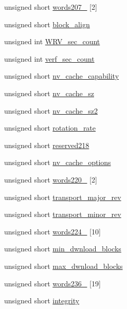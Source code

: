 \begin{DoxyCompactItemize}
unsigned short \hyperlink{structSATA__ident_a6d22ea8ccce917853c3558482d51c2ad}{words207\+\_} \mbox{[}2\mbox{]}
\item 
unsigned short \hyperlink{structSATA__ident_a7d3d9ee177c7fbdf752d10c4df81ce9f}{block\+\_\+align}
\item 
unsigned int \hyperlink{structSATA__ident_a9666dd870fe2ef49ea21adb0b897022d}{W\+R\+V\+\_\+sec\+\_\+count}
\item 
unsigned int \hyperlink{structSATA__ident_ac94f9f7b192f2f636310b6718d752aea}{verf\+\_\+sec\+\_\+count}
\item 
unsigned short \hyperlink{structSATA__ident_ad1ca0009d9c3bb07fc592074c4d0fa71}{nv\+\_\+cache\+\_\+capability}
\item 
unsigned short \hyperlink{structSATA__ident_a0a2b0b5c33bf357f681b9c96f82ac845}{nv\+\_\+cache\+\_\+sz}
\item 
unsigned short \hyperlink{structSATA__ident_a3d5a99c03cd6d648e743734cb5982f8d}{nv\+\_\+cache\+\_\+sz2}
\item 
unsigned short \hyperlink{structSATA__ident_ab28e705ed0d36775a4782ee4d5c37899}{rotation\+\_\+rate}
\item 
unsigned short \hyperlink{structSATA__ident_a06e5d3fdae8830492b2a8360a229f8d4}{reserved218}
\item 
unsigned short \hyperlink{structSATA__ident_a1cc18559fb89be13ccce7858162049b4}{nv\+\_\+cache\+\_\+options}
\item 
unsigned short \hyperlink{structSATA__ident_aa7710925f1b4b459e6499ce2d3e82408}{words220\+\_} \mbox{[}2\mbox{]}
\item 
unsigned short \hyperlink{structSATA__ident_ae04d840fdf1a87cc832b491a0e02ee0c}{transport\+\_\+major\+\_\+rev}
\item 
unsigned short \hyperlink{structSATA__ident_a582e9c9d3e52b0f84a4b311c48aaa2b5}{transport\+\_\+minor\+\_\+rev}
\item 
unsigned short \hyperlink{structSATA__ident_a1b7fe4d0ce0792c7d6e0c5b3ecfa7063}{words224\+\_} \mbox{[}10\mbox{]}
\item 
unsigned short \hyperlink{structSATA__ident_aad38263481e1b39593f8a381a072b170}{min\+\_\+dwnload\+\_\+blocks}
\item 
unsigned short \hyperlink{structSATA__ident_a93c778d7e7521c8e84682c52c8e5dc6e}{max\+\_\+dwnload\+\_\+blocks}
\item 
unsigned short \hyperlink{structSATA__ident_ab3312fab93f9e413abe360b4a1823c7b}{words236\+\_} \mbox{[}19\mbox{]}
\item 
unsigned short \hyperlink{structSATA__ident_a9bbddec56882e46f0385cea68e3d9f4c}{integrity}
\end{DoxyCompactItemize}


